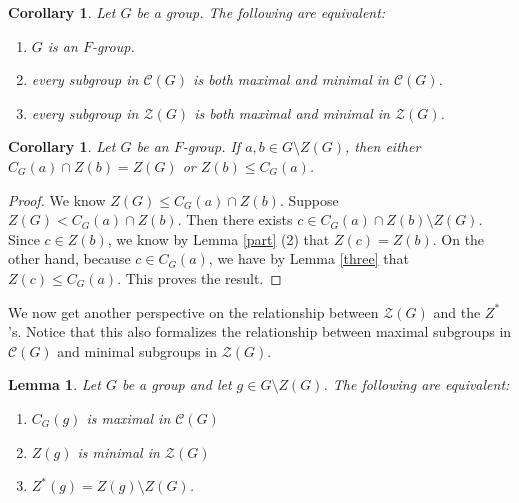 \documentclass[12pt]{amsart}
\newtheorem{corollary}[theorem]{Corollary}
\newtheorem{lemma}[theorem]{Lemma}
\begin{document}
{\begin{corollary}\label{maxmin}
Let $G$ be a group.  The following are equivalent:
\begin{enumerate}
\item $G$ is an $F$-group.
\item every subgroup in $\mathcal {C} (G)$ is both maximal and minimal in $\mathcal{C} (G)$.
\item every subgroup in $\mathcal {Z} (G)$ is both maximal and minimal in $\mathcal{Z} (G)$.
\end{enumerate}
\end{corollary}


\begin{corollary} \label{threea}
Let $G$ be an $F$-group.  If $a, b \in G \setminus Z(G)$, then either $C_G (a) \cap Z(b) = Z(G)$ or $Z(b) \le C_G(a)$.
\end{corollary}

\begin{proof}
We know $Z(G) \le C_G (a) \cap Z(b)$.  Suppose $Z(G) < C_G(a) \cap Z(b)$.  Then there exists $c \in C_G (a) \cap Z(b) \setminus Z(G)$.  Since $c \in Z(b)$, we know by Lemma \ref{part} (2) that $Z(c) = Z(b)$.  On the other hand, because $c \in C_G (a)$, we have by Lemma \ref{three} that $Z(c) \le C_G (a)$.  This proves the result.
\end{proof}

We now get another perspective on the relationship between $\mathcal{Z} (G)$ and the $Z^*$'s.  Notice that this also formalizes the relationship between maximal subgroups in $\mathcal {C} (G)$ and minimal subgroups in $\mathcal{Z} (G)$.

\begin{lemma} \label{maximal}
Let $G$ be a group and let $g \in G \setminus Z(G)$.   The following are equivalent:
\begin{enumerate}
\item $C_G(g)$ is maximal in ${\mathcal C} (G)$ %
\item $Z(g)$ is minimal in $\mathcal{Z} (G)$
\item $Z^* (g) = Z(g) \setminus Z(G)$.
\end{enumerate}
\end{lemma}

}
\end{document}

